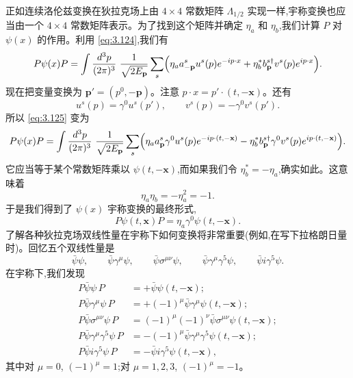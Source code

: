 正如连续洛伦兹变换在狄拉克场上由 $4\times4$ 常数矩阵 $\Lambda_{1/2}$ 实现一样,宇称变换也应当由一个 $4\times4$ 常数矩阵表示。为了找到这个矩阵并确定 $\eta_a$ 和 $\eta_b$,我们计算 $P$ 对 $\psi(x)$ 的作用。利用 \eqref{eq:3.124},我们有
\begin{equation}
  P\psi(x)P = \int \frac{d^3p}{(2\pi)^3}\ \frac{1}{\sqrt{2E_{\mathbf{p}}}}
    \sum_s \Bigl( \eta_a a_{-\mathbf{p}}^s u^s(p)e^{-ip\cdot x}
      + \eta_b^{*} b_{\mathbf{p}}^{s\dagger} v^s(p)e^{ip\cdot x} \Bigr).
  \label{eq:3.125}
\end{equation}
现在把变量变换为 $\mathbf{p}' = (p^0, -\mathbf{p})$。注意
$p\cdot x = p'\cdot(t,-\mathbf{x})$。还有
\begin{equation}
  u^s(p) = \gamma^0 u^s(p'),\qquad
  v^s(p) = -\gamma^0 v^s(p').
\end{equation}
所以 \eqref{eq:3.125} 变为
\begin{equation}
  P\psi(x)P = \int \frac{d^3p}{(2\pi)^3}\ \frac{1}{\sqrt{2E_{\mathbf{p}}}}
    \sum_s \Bigl( \eta_a a_{\mathbf{p}}^s \gamma^0 u^s(p)e^{-ip\cdot
      (t,-\mathbf{x})} - \eta_b^{*} b_{\mathbf{p}}^{s\dagger} \gamma^0 v^s(p)
      e^{ip\cdot(t,-\mathbf{x})} \Bigr).
\end{equation}
它应当等于某个常数矩阵乘以 $\psi(t,-\mathbf{x})$,而如果我们令 $\eta_b^{*} = -\eta_a$,确实如此。这意味着
\begin{equation}
  \eta_a\eta_b = -\eta_a^2 = -1 .
  \label{eq:3.126}
\end{equation}
于是我们得到了 $\psi(x)$ 宇称变换的最终形式,
\begin{equation}
  P\psi(t,\mathbf{x})P = \eta_a\gamma^0\psi(t,-\mathbf{x}) .
  \label{eq:3.127}
\end{equation}
了解各种狄拉克场双线性量在宇称下如何变换将非常重要(例如,在写下拉格朗日量时)。回忆五个双线性量是
\begin{equation}
  \bar{\psi}\psi,\qquad \bar{\psi}\gamma^\mu\psi,\qquad
  \bar{\psi}\sigma^{\mu\nu}\psi,\qquad
  \bar{\psi}\gamma^\mu\gamma^5\psi,\qquad
  \bar{\psi}i\gamma^5\psi .
\end{equation}
在宇称下,我们发现
\begin{align}
  P\bar{\psi}\psi\,P &= +\bar{\psi}\psi(t,-\mathbf{x});\\
  P\bar{\psi}\gamma^\mu\psi\,P &=
    +(-1)^\mu\bar{\psi}\gamma^\mu\psi(t,-\mathbf{x});\\
  P\bar{\psi}\sigma^{\mu\nu}\psi\,P &=
    (-1)^\mu(-1)^\nu\bar{\psi}\sigma^{\mu\nu}\psi(t,-\mathbf{x});\\
  P\bar{\psi}\gamma^\mu\gamma^5\psi\,P &=
    -(-1)^\mu\bar{\psi}\gamma^\mu\gamma^5\psi(t,-\mathbf{x});\\
  P\bar{\psi}i\gamma^5\psi\,P &=
    -\bar{\psi}i\gamma^5\psi(t,-\mathbf{x}),
\end{align}
其中对 $\mu = 0$, $(-1)^\mu = 1$;对 $\mu = 1, 2, 3$, $(-1)^\mu = -1$。

